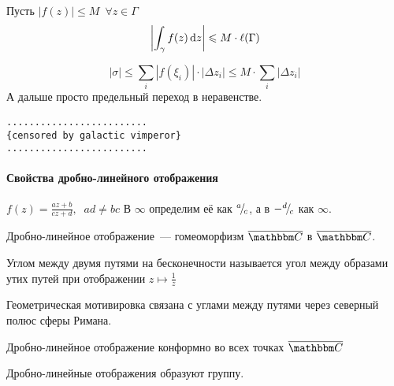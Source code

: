 \documentclass[12pt,timbord]{../../../notes}
\begin{document}
\begin{cor}\label{cor:tfcv::compint::length}
  Пусть $|f(z)| \leqslant M\;\: \forall z \in \Gamma$
  \[
    \left|\int_\gamma f(z) \,\mathrm{d} z\right| \leqslant M  \cdot \ell(\Gamma)
  \]
\end{cor}
\begin{itlproof}
  \[
    |\sigma| \leqslant \sum_{i} |f(\xi_i)| \cdot |\Delta z_i| \leqslant M \cdot \sum_i |\Delta
    z_i|
  \]
  А дальше просто  предельный переход в неравенстве.
\end{itlproof}


\begin{verbatim}
.........................
{censored by galactic vimperor}
.........................
\end{verbatim}

\setcounter{paragraph}{29}
\paragraph{Свойства дробно-линейного отображения}
\label{par:tfcv::fraclin}

\begin{defn}\label{defn:tfcv::fraclin::def}
  $\displaystyle f(z) = \frac{a z + b}{c z + d}, \;\; ad \neq bc$ 
  В $\infty$ определим её как ${}^{a}\!/_{\!c}$, а в $-{}^{d}\!/_{\!c}$ как $\infty$.
\end{defn}

\begin{prop}\label{thrm:tfcv::fraclin::bij}
  Дробно-линейное отображение~--- гомеоморфизм $\exC$ в $\exC$.
\end{prop}
\begin{defn}\label{defn:tfcv::fraclin::infangle}
  Углом между двумя путями на бесконечности называется угол между образами утих путей при
  отображении $z \mapsto \frac{1}{z}$
\end{defn}
\begin{rem*}
  Геометрическая мотивировка связана с углами между путями через северный полюс сферы Римана.
\end{rem*}

\begin{prop}\label{thrm:tfcv::fraclin::conf}
  Дробно-линейное отображение конформно во всех точках $\exC$
\end{prop}

\begin{prop}\label{thrm:tfcv::fraclin::group}
  Дробно-линейные отображения образуют группу.
\end{prop}
\end{document}
